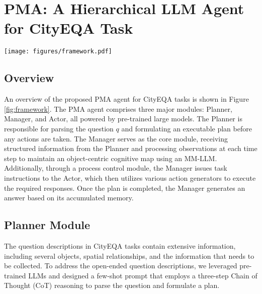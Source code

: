

\section{PMA: A Hierarchical LLM Agent for CityEQA Task}\label{method}

 \begin{figure*}[!htb]
\centering
    \texttt{[image: figures/framework.pdf]}
\caption{The overview of our proposed PMA agent.}
\label{fig:framework}
\end{figure*}

\subsection{Overview}

An overview of the proposed PMA agent for CityEQA tasks is shown in Figure \ref{fig:framework}. The PMA agent comprises three major modules: Planner, Manager, and Actor, all powered by pre-trained large models. The Planner is responsible for parsing the question $q$ and formulating an executable plan before any actions are taken. The Manager serves as the core module, receiving structured information from the Planner and processing observations at each time step to maintain an object-centric cognitive map using an MM-LLM. Additionally, through a process control module, the Manager issues task instructions to the Actor, which then utilizes various action generators to execute the required responses. Once the plan is completed, the Manager generates an answer based on  its accumulated memory.

\subsection{Planner Module}
The question descriptions in CityEQA tasks contain extensive information, including several objects, spatial relationships, and the information that needs to be collected. To address the open-ended question descriptions, we leveraged pre-trained LLMs and designed a few-shot prompt that employs a three-step Chain of Thought (CoT) reasoning \cite{wei2022chain} to parse the question and formulate a plan.

